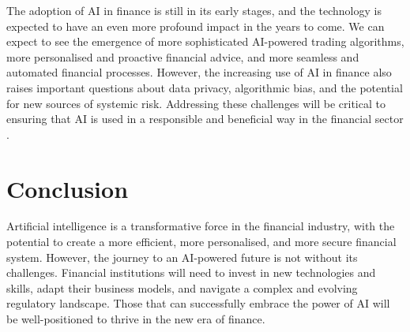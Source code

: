The adoption of AI in finance is still in its early stages, and the technology is expected to have an even more profound impact in the years to come. We can expect to see the emergence of more sophisticated AI-powered trading algorithms, more personalised and proactive financial advice, and more seamless and automated financial processes. However, the increasing use of AI in finance also raises important questions about data privacy, algorithmic bias, and the potential for new sources of systemic risk. Addressing these challenges will be critical to ensuring that AI is used in a responsible and beneficial way in the financial sector \parencite{fma2024understanding}.

\section{Conclusion}

Artificial intelligence is a transformative force in the financial industry, with the potential to create a more efficient, more personalised, and more secure financial system. However, the journey to an AI-powered future is not without its challenges. Financial institutions will need to invest in new technologies and skills, adapt their business models, and navigate a complex and evolving regulatory landscape. Those that can successfully embrace the power of AI will be well-positioned to thrive in the new era of finance.